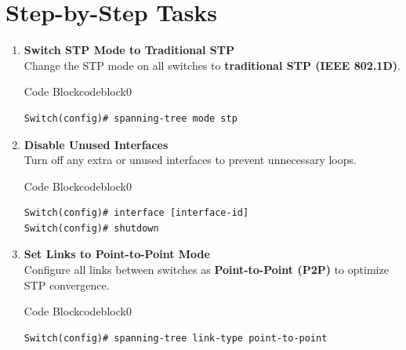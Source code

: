 \documentclass[a4paper]{book}
\begin{document}
\section*{Step-by-Step Tasks}

\begin{enumerate}
    \item \textbf{Switch STP Mode to Traditional STP} \\
    Change the STP mode on all switches to \textbf{traditional STP (IEEE 802.1D)}. 



\begin{ocg}{Code Block}{codeblock}{0}
\vspace{0.5cm}
\begin{lstlisting}
Switch(config)# spanning-tree mode stp
\end{lstlisting}

\end{ocg}

    \item \textbf{Disable Unused Interfaces} \\
    Turn off any extra or unused interfaces to prevent unnecessary loops.



\begin{ocg}{Code Block}{codeblock}{0}
\vspace{0.5cm}
\begin{lstlisting}
Switch(config)# interface [interface-id]
Switch(config)# shutdown

\end{lstlisting}

\end{ocg}


    \item \textbf{Set Links to Point-to-Point Mode} \\
    Configure all links between switches as \textbf{Point-to-Point (P2P)} to optimize STP convergence.



\begin{ocg}{Code Block}{codeblock}{0}
\vspace{0.5cm}
\begin{lstlisting}
Switch(config)# spanning-tree link-type point-to-point



\end{lstlisting}
\end{ocg}
\end{enumerate}
\end{document}
